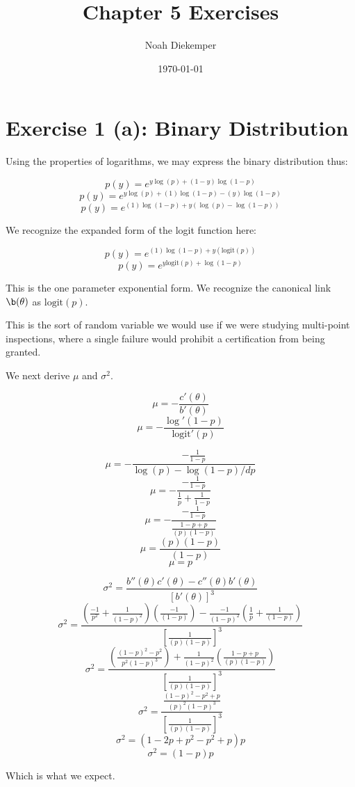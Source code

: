 \documentclass[12pt,a4paper]{article}
\begin{document}
\title{Chapter 5 Exercises}
\author{Noah Diekemper}
\date{\today}
\maketitle

\section{Exercise 1 (a): Binary Distribution}

Using the properties of logarithms, we may express the binary distribution thus: 

$$p(y) = e^{y\log (p) + (1-y)\log(1-p)}$$
$$p(y) = e^{y\log (p) + (1)\log(1-p) - (y)\log(1-p)}$$
$$p(y) = e^{(1)\log(1-p) + y(\log (p) - \log(1-p))}$$

We recognize the expanded form of the logit function here: 

$$p(y) = e^{(1)\log(1-p) + y(\text{logit}(p))}$$
$$p(y) = e^{y\text{logit}(p) + \log(1-p)}$$

This is the one parameter exponential form. We recognize the canonical link $\b(\theta)$ as $\text{logit}(p)$.

This is the sort of random variable we would use if we were studying multi-point inspections, where a single failure would prohibit a certification from being granted. 

\newpage

We next derive $\mu$ and $\sigma^{2}$.

$$\mu = - \frac{c'(\theta)}{b'(\theta)}$$
$$\mu = - \frac{\log'(1-p)}{\text{logit}'(p)}$$

$$\mu = - \frac{-\frac{1}{1-p}}{\log(p) - \log(1-p) /dp}$$
$$\mu = - \frac{-\frac{1}{1-p}}{\frac{1}{p} + \frac{1}{1-p} }$$
$$\mu = - \frac{-\frac{1}{1-p}}{\frac{1 - p + p}{(p)(1-p)}}$$
$$\mu =  \frac{(p)(1-p)}{(1-p)}$$
$$\mu =  p$$

$$\sigma^{2} = \frac{b''(\theta)c'(\theta) - c''(\theta)b'(\theta)}{[b'(\theta)]^{3}}$$
$$\sigma^{2} = \frac{(\frac{-1}{p^2} + \frac{1}{(1-p)^2})(\frac{-1}{(1-p)}) - \frac{-1}{(1-p)^2}(\frac{1}{p} + \frac{1}{(1-p)})}{[\frac{1}{(p)(1-p)}]^{3}}$$
$$\sigma^{2} = \frac{(\frac{(1-p)^{2} - p^{2}}{p^2(1-p)^{3}}) + \frac{1}{(1-p)^2}(\frac{1-p+p}{(p)(1-p)})}{[\frac{1}{(p)(1-p)}]^{3}}$$
$$\sigma^{2} = \frac{\frac{(1-p)^2-p^2+p}{(p)^2(1-p)^3}}{[\frac{1}{(p)(1-p)}]^{3}}$$
$$\sigma^{2} = (1-2p+p^2-p^2+p)p$$
$$\sigma^{2} = (1-p)p$$

Which is what we expect. 
\end{document}

